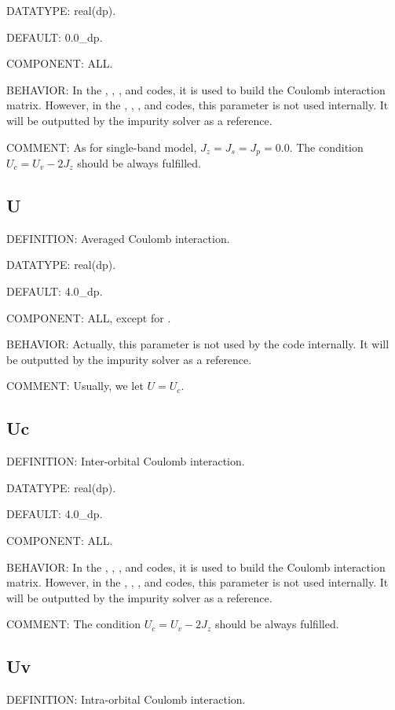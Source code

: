 {\color{green}DATATYPE:} real(dp).

{\color{blue}DEFAULT:} 0.0\_dp.

{\color{brown}COMPONENT:} ALL.

{\color{purple}BEHAVIOR:} In the {\azalea}, {\gardenia}, {\narcissus}, and {\daisy} codes, it is used to build the Coulomb interaction matrix. However, in the {\begonia}, {\lavender}, {\pansy}, and {\manjushaka} codes, this parameter is not used internally. It will be outputted by the impurity solver as a reference.

{\color{olive}COMMENT:} As for single-band model, $J_z = J_s = J_p = 0.0$. The condition $U_c = U_v - 2J_{z}$ should be always fulfilled.

\subsection{U}
{\color{red}DEFINITION:} Averaged Coulomb interaction.

{\color{green}DATATYPE:} real(dp).

{\color{blue}DEFAULT:} 4.0\_dp.

{\color{brown}COMPONENT:} ALL, except for {\daisy}.

{\color{purple}BEHAVIOR:} Actually, this parameter is not used by the code internally. It will be outputted by the impurity solver as a reference.

{\color{olive}COMMENT:} Usually, we let $U = U_c$.

\subsection{Uc}
{\color{red}DEFINITION:} Inter-orbital Coulomb interaction.

{\color{green}DATATYPE:} real(dp).

{\color{blue}DEFAULT:} 4.0\_dp.

{\color{brown}COMPONENT:} ALL.

{\color{purple}BEHAVIOR:} In the {\azalea}, {\gardenia}, {\narcissus}, and {\daisy} codes, it is used to build the Coulomb interaction matrix. However, in the {\begonia}, {\lavender}, {\pansy}, and {\manjushaka} codes, this parameter is not used internally. It will be outputted by the impurity solver as a reference.

{\color{olive}COMMENT:} The condition $U_c = U_v - 2J_{z}$ should be always fulfilled.

\subsection{Uv}
{\color{red}DEFINITION:} Intra-orbital Coulomb interaction.

